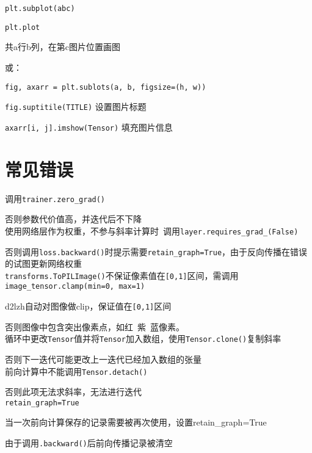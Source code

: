 \documentclass[UTF8]{ctexart}
\begin{document}
  \quad \quad \texttt{plt.subplot(abc)}

  \quad \quad \texttt{plt.plot}

  \quad \quad \quad 共a行b列，在第c图片位置画图

  \quad 或：

  \quad \quad \texttt{fig, axarr = plt.sublots(a, b, figsize=(h, w))}

  \quad \quad \texttt{fig.suptitile(TITLE)} 设置图片标题

  \quad \quad \texttt{axarr[i, j].imshow(Tensor)} 填充图片信息


\section{常见错误}
\noindent 调用\texttt{trainer.zero\_grad()}

  否则参数代价值高，并迭代后不下降\\
使用网络层作为权重，不参与斜率计算时\ 调用\texttt{layer.requires\_grad\_(False)}

  否则调用\texttt{loss.backward()}时提示需要\texttt{retain\_graph=True}，由于反向传播在错误的试图更新网络权重\\
\texttt{transforms.ToPILImage()}不保证像素值在\texttt{[0,1]}区间，需调用\texttt{image\_tensor.clamp(min=0, max=1)}

  d2lzh自动对图像做clip，保证值在\texttt{[0,1]}区间
  
  否则图像中包含突出像素点，如红\ 紫\ 蓝像素。\\
循环中更改\texttt{Tensor}值并将\texttt{Tensor}加入数组，使用\texttt{Tensor.clone()}复制斜率

  否则下一迭代可能更改上一迭代已经加入数组的张量\\
前向计算中不能调用\texttt{Tensor.detach()}

  否则此项无法求斜率，无法进行迭代\\
\texttt{retain\_graph=True}

  当一次前向计算保存的记录需要被再次使用，设置retain\_graph=True 

  由于调用\texttt{.backward()}后前向传播记录被清空
\end{document}
